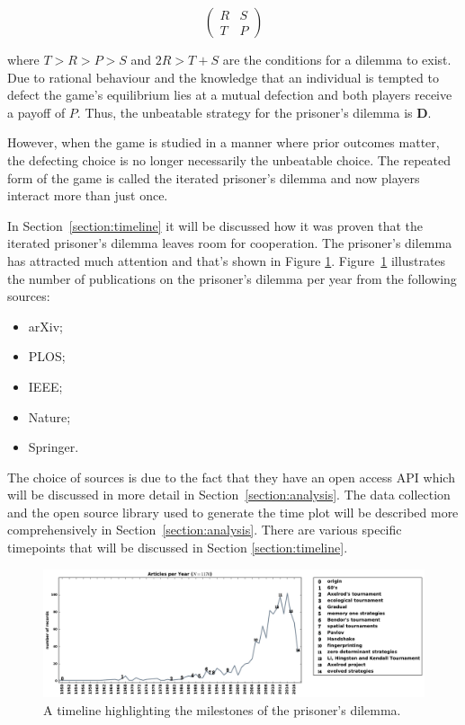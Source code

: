 \documentclass{article}
\begin{document}
\begin{equation} \label{eq:the_pd_payoffs}
    \begin{pmatrix}
    R & S \\ T & P
    \end{pmatrix}
\end{equation}

where \(T > R > P > S \) and \(2R > T + S\) are the conditions for a dilemma
to exist. Due to rational behaviour and the knowledge that an individual is tempted
to defect the game's equilibrium lies at a mutual defection and both players
receive a payoff of \(P\). Thus, the unbeatable strategy for the prisoner's dilemma
is \textbf{D}.

However, when the game is studied in a manner where prior outcomes matter, the 
defecting choice is no longer necessarily the unbeatable choice. The repeated 
form of the game is called the iterated prisoner's dilemma and now players 
interact more than just once.

In Section~\ref{section:timeline} it will be discussed how it was proven that
the iterated prisoner's dilemma leaves room for cooperation. The prisoner's
dilemma has attracted much attention and that's shown in Figure
\ref{fig:timeline}. Figure~\ref{fig:timeline} illustrates the number of 
publications on the prisoner's dilemma per year from the following sources:

\begin{multicols}{3}
    \begin{itemize}
        \item arXiv;
        \item PLOS;
        \item IEEE;
        \item Nature;
        \item Springer.
    \end{itemize}
\end{multicols}

The choice of sources is due to the fact that they have an open access API
which will be discussed in more detail in Section~\ref{section:analysis}. %
The data collection and the open source library used to generate the time plot 
will be described more comprehensively in Section~\ref{section:analysis}.
There are various specific timepoints that will be discussed in Section
\ref{section:timeline}.

\begin{figure}[!htbp]
    \centering
    \includegraphics[width=\textwidth]{assets/images/timeline.pdf}
    \caption{\label{fig:timeline} A timeline highlighting the milestones of the 
    prisoner's dilemma.}
\end{figure}
\end{document}
